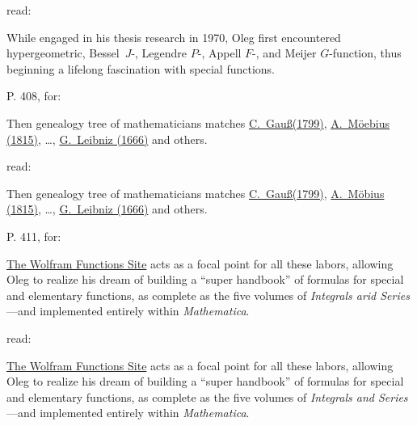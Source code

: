 read:



While engaged in his thesis research in 1970, Oleg first encountered hypergeometric, \mbox{Bessel~$J$-,} Legendre $P$-, Appell $F$-, and Meijer $G$-function, thus beginning a lifelong fascination with special functions.









\bigskip



\noindent

P. 408, for:



Then genealogy tree of mathematicians matches \href{http://www.genealogy.ams.org/id.php?id=18231}{C.~Gau\ss (1799)}, \href{http://www.genealogy.ams.org/id.php?id=35953}{A.~M\"oebius (1815)}, \dots, \href{http://www.genealogy.ams.org/id.php?id=60985}{G.~Leibniz (1666)} and others.





read:



Then genealogy tree of mathematicians matches \href{http://www.genealogy.ams.org/id.php?id=18231}{C.~Gau\ss (1799)}, \href{http://www.genealogy.ams.org/id.php?id=35953}{A.~M\"obius (1815)}, \dots, \href{http://www.genealogy.ams.org/id.php?id=60985}{G.~Leibniz (1666)} and others.







\bigskip



\noindent

P. 411, for:



 \href{http://functions.wolfram.com}{The Wolfram Functions Site} acts as a focal point for all these labors, allowing Oleg to realize his dream of building a ``super handbook'' of formulas for special and elementary functions, as complete as the five volumes of \textit{Integrals arid Series}---and implemented entirely within \textit{Mathematica}. 



read:



\href{http://functions.wolfram.com}{The Wolfram Functions Site} acts as a focal point for all these labors, allowing Oleg to realize his dream of building a ``super handbook'' of formulas for special and elementary functions, as complete as the five volumes of \textit{Integrals and Series}---and implemented entirely within \textit{Mathematica}. 



